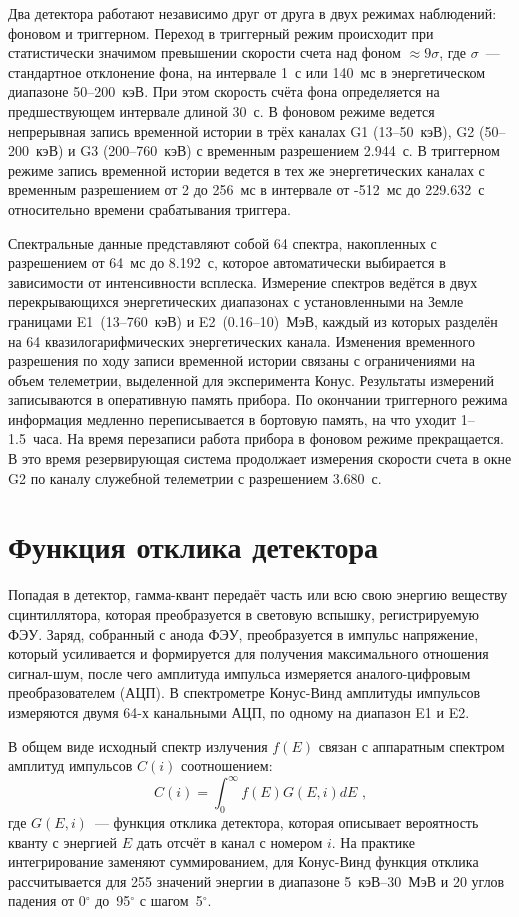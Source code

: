 Два детектора работают независимо друг от друга в двух режимах наблюдений: 
фоновом и триггерном. Переход в триггерный режим происходит при статистически 
значимом превышении скорости счета над фоном $\approx 9\sigma$, 
где $\sigma$~--- стандартное отклонение фона, на интервале 1~с или 140~мс 
в энергетическом диапазоне 50--200~кэВ. При этом скорость счёта фона 
определяется на предшествующем интервале длиной 30~с. В фоновом режиме ведется 
непрерывная запись временной истории в трёх каналах G1 (13--50~кэВ), G2 (50--200~кэВ) 
и G3 (200--760~кэВ) с временным разрешением 2.944~с. В триггерном режиме запись 
временной истории ведется в тех же энергетических каналах с временным разрешением 
от 2 до 256~мс в интервале от -512~мс до 229.632~с относительно времени срабатывания 
триггера.

Спектральные данные представляют собой 64 спектра, накопленных с разрешением от 64~мс до 8.192~с, 
которое автоматически выбирается в зависимости от интенсивности всплеска. Измерение спектров ведётся 
в двух перекрывающихся энергетических диапазонах с установленными на Земле границами 
E1~(13--760~кэВ) и E2~(0.16--10)~МэВ, каждый из которых разделён на 64 квазилогарифмических энергетических канала. 
Изменения временного разрешения по ходу записи временной истории связаны с ограничениями на объем телеметрии, 
выделенной для эксперимента Конус. Результаты измерений записываются в оперативную 
память прибора. По окончании триггерного режима информация медленно переписывается 
в бортовую память, на что уходит 1--1.5~часа. На время перезаписи работа прибора 
в фоновом режиме прекращается. В это время резервирующая система продолжает измерения
скорости счета в окне G2 по каналу служебной телеметрии с разрешением 3.680~с.

\section{Функция отклика детектора}
Попадая в детектор, гамма-квант передаёт часть или всю свою энергию веществу 
сцинтиллятора, которая преобразуется в световую вспышку, регистрируемую ФЭУ. 
Заряд, собранный с анода ФЭУ, преобразуется в импульс напряжение, который усиливается и формируется для получения 
максимального отношения сигнал-шум, после чего амплитуда импульса измеряется 
аналого-цифровым преобразователем (АЦП). В спектрометре Конус-Винд амплитуды импульсов 
измеряются двумя 64-х канальными АЦП, по одному на диапазон E1 и E2.

В общем виде исходный спектр излучения $f(E)$ связан с аппаратным спектром амплитуд 
импульсов $C(i)$ соотношением:
\begin{equation}\label{eq:response}
    C(i)=\int_{0}^{\infty} f(E)G(E,i) dE \mbox{ ,}
\end{equation}
где $G(E,i)$~--- функция отклика детектора, которая описывает вероятность кванту 
с энергией $E$ дать отсчёт в канал с номером $i$. На практике интегрирование 
заменяют суммированием, для Конус-Винд функция отклика рассчитывается для 255 
значений энергии в диапазоне 5~кэВ--30~МэВ и 20 углов падения 
от 0$^\circ$ до~95$^\circ$ с шагом~5$^\circ$.

